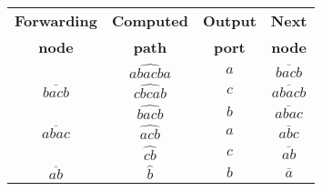 \small
\begin{tabular}[b]{|c| c |c |c|}
\hline
\rowcolor{gray!30}\textbf{{Forwarding}}&\textbf{{Computed}}&\textbf{{Output}}&\textbf{{Next}}\\
\rowcolor{gray!30}\textbf{{node}}&\textbf{{path}}&\textbf{{port}}&\textbf{{node}}\\
\hline
  \hline
  \rowcolor{gray!10}\multirow{1}{*}{$\overline{bacba}$}&\multirow{1}{*}{$\widehat{abacba}$}& \multirow{1}{*}{$a$}&\multirow{1}{*}{$\overline{bacb}$} \\ 
 \multirow{1}{*}{$\overline{bacb}$}&\multirow{1}{*}{$\widehat{cbcab}$}& \multirow{1}{*}{$c$}&\multirow{1}{*}{$\overline{abacb}$} \\ 
\rowcolor{gray!10}
\multirow{1}{*}{$\overline{abacb}$}&\multirow{1}{*}{$\widehat{bacb}$}& \multirow{1}{*}{$b$}&\multirow{1}{*}{$\overline{abac}$} \\ 
\multirow{1}{*}{$\overline{abac}$}&\multirow{1}{*}{$\widehat{acb}$}& \multirow{1}{*}{$a$}&\multirow{1}{*}{$\overline{abc}$} \\  
\rowcolor{gray!10}\multirow{1}{*}{$\overline{abc}$}&\multirow{1}{*}{$\widehat{cb}$}& \multirow{1}{*}{$c$}&\multirow{1}{*}{$\overline{ab}$} \\ 
\multirow{1}{*}{$\overline{ab}$}&\multirow{1}{*}{$\widehat{b}$}& \multirow{1}{*}{$b$}&\multirow{1}{*}{$\overline{a}$} \\ 
\hline
\end{tabular}
